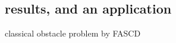 \documentclass[svgnames,
               hyperref={colorlinks,citecolor=DeepPink4,linkcolor=FireBrick,urlcolor=Maroon},
               usepdftitle=false]  %
               {beamer}
\begin{document}
\subsection{results, and an application}

\begin{frame}{classical obstacle problem by FASCD}


\end{frame}
\end{document}

